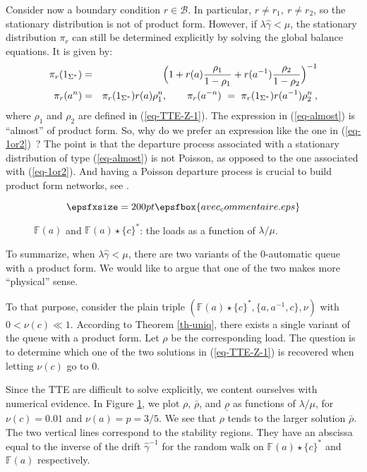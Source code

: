\documentclass[11pt,a4paper]{article}
\theoremstyle{remark}
\def\Blackboardfont{\mathbb}
\def\cb{\cB}
\def\F{{\Blackboardfont F}}
\def\cB{{\mathcal B}}
\def\eref#1{(\ref{#1})}
\begin{document}
Consider now a boundary condition $r\in \cb$. In particular,
$r\neq r_1, \ r\neq r_2$, so the stationary distribution is not of
product form. However, if  $\lambda\widehat{\gamma}< \mu$, the
stationary distribution $\pi_r$ can still be determined explicitly
by solving the global balance equations. It is given by:
\begin{eqnarray}\label{eq-almost}
\pi_r(1_{\Sigma^*})& = & \Bigl( 1+r(a)\displaystyle\frac{\rho_1}
{1-\rho_1}+r(a^{-1})\displaystyle\frac{\rho_2}{1-\rho_2} \Bigr)^{-1} \nonumber\\
\pi_r(a^{n})& = & \pi_r(1_{\Sigma^*})r(a)\rho_1^n, \qquad
\pi_r(a^{-n}) \ = \ \pi_r(1_{\Sigma^*}) r(a^{-1})\rho_2^n \:,
\end{eqnarray}
where $\rho_1$ and $\rho_2$ are defined in \eref{eq-TTE-Z-1}.
The expression in \eref{eq-almost} is ``almost'' of product form. So, why do we
prefer an expression like the one in \eref{eq-1or2}~?
The point is that the departure process associated with a
stationary distribution of type \eref{eq-almost} is not Poisson, as opposed to
the one associated with \eref{eq-1or2}. And having a Poisson departure
process is crucial
to build product form networks, see \cite{DaMa06}.

\begin{figure}[ht]
\[ \epsfxsize=200pt \epsfbox{avec_commentaire.eps} \]
\caption{$\F(a)$ and $\F(a)\star \{c\}^*$: the loads as a
  function of $\lambda/\mu$.}
\label{fi-a-petit c}
\end{figure}

To summarize, when $\lambda \widehat{\gamma} < \mu$, there are two variants of the 0-automatic
queue with a product form.
We would like to argue that one of the two
makes more ``physical'' sense.

To that purpose,
consider the plain triple $(\F(a)\star\{c\}^*,
\{a,a^{-1},c\},\nu)$ with $0< \nu(c) \ll 1$.
According to
Theorem \ref{th-uniq}, there exists a single variant of the queue with a
product form. Let $\rho$ be the corresponding load. The question is to
determine which one of the two 
solutions in \eref{eq-TTE-Z-1} is recovered when letting $\nu(c)$ go to
0.

Since the TTE are difficult to solve explicitly, we content
ourselves with numerical evidence. In Figure \ref{fi-a-petit c},
we plot $\rho$, $\bar{\rho}$, and $\underline{\rho}$ as functions
of $\lambda/\mu$, for $\nu(c)=0.01$ and $\nu(a)=p=3/5$. We see
that $\rho$ tends to the larger solution $\bar{\rho}$. The two
vertical lines correspond to the stability regions. They have an
abscissa equal to the inverse of the drift 
$\widehat{\gamma}^{-1}$ for the random walk on $\F(a)\star \{c\}^*$
and $\F(a)$ respectively.
\end{document}

